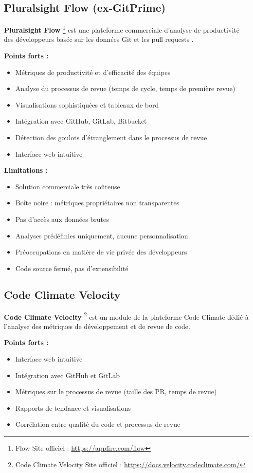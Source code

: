 \subsection{Pluralsight Flow (ex-GitPrime)}

\textbf{Pluralsight Flow} \footnote{Flow Site officiel : \url{https://appfire.com/flow}} est une plateforme commerciale d'analyse de productivité des développeurs basée sur les données Git et les pull requests \cite{appfire_flow,appfire_flow_review_metrics}.

\textbf{Points forts :}
\begin{itemize}
    \item Métriques de productivité et d'efficacité des équipes
    \item Analyse du processus de revue (temps de cycle, temps de première revue)
    \item Visualisations sophistiquées et tableaux de bord
    \item Intégration avec GitHub, GitLab, Bitbucket
    \item Détection des goulots d'étranglement dans le processus de revue
    \item Interface web intuitive
\end{itemize}

\textbf{Limitations :}
\begin{itemize}
    \item Solution commerciale très coûteuse
    \item Boîte noire : métriques propriétaires non transparentes
    \item Pas d'accès aux données brutes
    \item Analyses prédéfinies uniquement, aucune personnalisation
    \item Préoccupations en matière de vie privée des développeurs
    \item Code source fermé, pas d'extensibilité
\end{itemize}

\subsection{Code Climate Velocity}

\textbf{Code Climate Velocity} \footnote{Code Climate Velocity Site officiel : \url{https://docs.velocity.codeclimate.com/}} est un module de la plateforme Code Climate dédié à l'analyse des métriques de développement et de revue de code.

\textbf{Points forts :}
\begin{itemize}
    \item Interface web intuitive
    \item Intégration avec GitHub et GitLab
    \item Métriques sur le processus de revue (taille des PR, temps de revue)
    \item Rapports de tendance et visualisations
    \item Corrélation entre qualité du code et processus de revue
\end{itemize}


